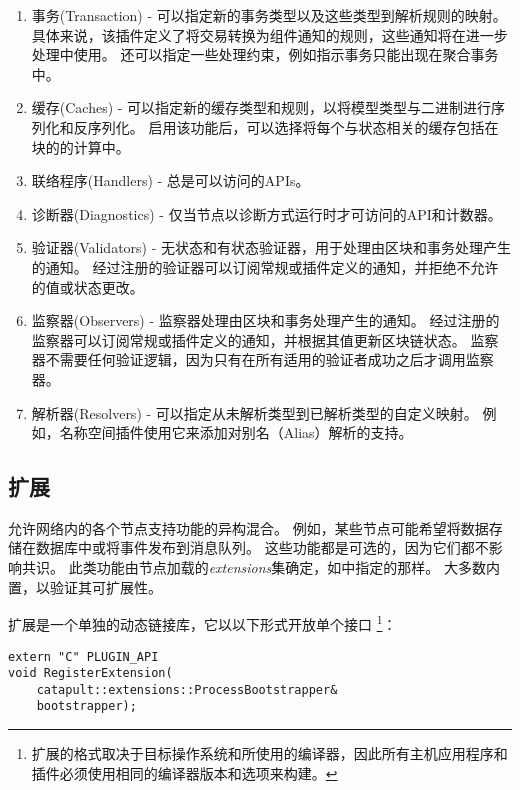 \begin{enumerate}
	\item{事务(Transaction) -
		可以指定新的事务类型以及这些类型到解析规则的映射。
		具体来说，该插件定义了将交易转换为组件通知的规则，这些通知将在进一步处理中使用。
		还可以指定一些处理约束，例如指示事务只能出现在聚合事务中。
	}
	\item{缓存(Caches) -
		可以指定新的缓存类型和规则，以将模型类型与二进制进行序列化和反序列化。
		启用该功能后，可以选择将每个与状态相关的缓存包括在块的的计算中。
	}
	\item{联络程序(Handlers) - 总是可以访问的APIs。}
	\item{诊断器(Diagnostics) - 仅当节点以诊断方式运行时才可访问的API和计数器。}
	\item{验证器(Validators) -
		无状态和有状态验证器，用于处理由区块和事务处理产生的通知。
		经过注册的验证器可以订阅常规或插件定义的通知，并拒绝不允许的值或状态更改。	
	}
	\item{监察器(Observers) -
		监察器处理由区块和事务处理产生的通知。
		经过注册的监察器可以订阅常规或插件定义的通知，并根据其值更新区块链状态。
		监察器不需要任何验证逻辑，因为只有在所有适用的验证者成功之后才调用监察器。
	}
	\item{解析器(Resolvers) -
		可以指定从未解析类型到已解析类型的自定义映射。
		例如，名称空间插件使用它来添加对别名（Alias）解析的支持。
	}
\end{enumerate}

\subsection{\codenamespace 扩展}
\label{sec:system:extensions}

允许网络内的各个节点支持功能的异构混合。
例如，某些节点可能希望将数据存储在数据库中或将事件发布到消息队列。
这些功能都是可选的，因为它们都不影响共识。
此类功能由节点加载的\emph{extensions}集确定，如中指定的那样。
大多数内置，以验证其可扩展性。

扩展是一个单独的动态链接库，它以以下形式开放单个接口
\footnote{扩展的格式取决于目标操作系统和所使用的编译器，因此所有主机应用程序和插件必须使用相同的编译器版本和选项来构建。}：

\begin{lstlisting}
extern "C" PLUGIN_API
void RegisterExtension(
	catapult::extensions::ProcessBootstrapper& 
	bootstrapper);
\end{lstlisting}

